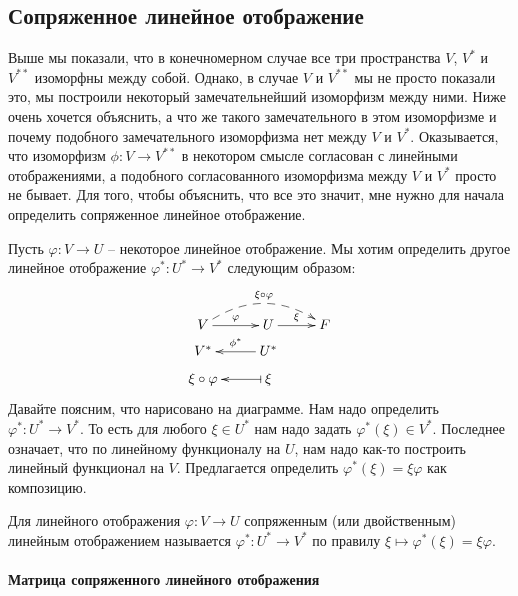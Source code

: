 \subsection{Сопряженное линейное отображение}

Выше мы показали, что в конечномерном случае все три пространства $V$, $V^*$ и $V^{**}$ изоморфны между собой.
Однако, в случае $V$ и $V^{**}$ мы не просто показали это, мы построили некоторый замечательнейший изоморфизм между ними.
Ниже очень хочется объяснить, а что же такого замечательного в этом изоморфизме и почему подобного замечательного изоморфизма нет между $V$ и $V^*$.
Оказывается, что изоморфизм $\phi\colon V \to V^{**}$ в некотором смысле согласован с линейными отображениями, а подобного согласованного изоморфизма между $V$ и $V^*$ просто не бывает.
Для того, чтобы объяснить, что все это значит, мне нужно для начала определить сопряженное линейное отображение.

Пусть $\varphi\colon V\to U$ -- некоторое линейное отображение.
Мы хотим определить другое линейное отображение $\varphi^* \colon U^*\to V^*$ следующим образом:
\[
\xymatrix@R=6pt{
	{V}\ar[r]^{\varphi}\ar@{-->}@/^16pt/[rr]^{\xi\circ \varphi}&{U}\ar[r]^{\xi}&{F}\\
	{V^*}&{U^*}\ar[l]_{\phi^*}&{}\\
	{\xi\circ \varphi}&{\xi}\ar@{|->}[l]&{}\\
}
\]
Давайте поясним, что нарисовано на диаграмме.
Нам надо определить $\varphi^*\colon U^*\to V^*$.
То есть для любого $\xi\in U^*$ нам надо задать $\varphi^*(\xi)\in V^*$.
Последнее означает, что по линейному функционалу на $U$, нам надо как-то построить линейный функционал на $V$.
Предлагается определить $\varphi^*(\xi) = \xi \varphi$ как композицию.

\begin{definition}
Для линейного отображения $\varphi\colon V\to U$ сопряженным (или двойственным) линейным отображением называется $\varphi^*\colon U^*\to V^*$ по правилу $\xi \mapsto \varphi^*(\xi) = \xi \varphi$.
\end{definition}

\paragraph{Матрица сопряженного линейного отображения}

